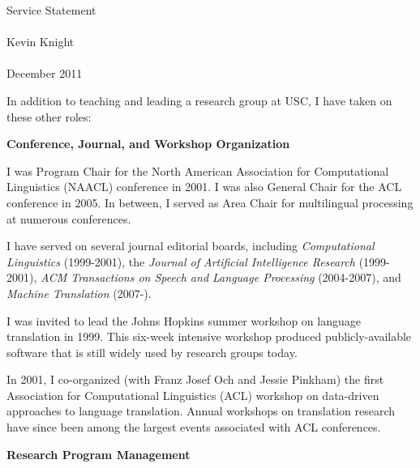 


\newcommand{\hd}[1]{
\vspace*{0.2in} 
\noindent 
{\bf \Large #1}
\hspace{0.1in}
\vspace*{0.2in}}

\vspace{0.5in}


\begin{Large}
\begin{center}
Service Statement \\
\hspace{1mm} \\
Kevin Knight \\
\hspace{1mm} \\
December 2011
\end{center}
\end{Large}

\vspace{0.2in}

\noindent
In addition to teaching and leading a research group at USC, I have 
taken on these other roles:  

\hd{Conference, Journal, and Workshop Organization}

\noindent
I was Program Chair for the North American Association for 
Computational Linguistics (NAACL) conference in 2001.
I was also General Chair for the ACL conference in 2005.  
In between, I served as Area Chair for multilingual processing 
at numerous conferences.

I have served on several journal editorial boards, including {\em 
Computational Linguistics} (1999-2001), the {\em Journal of Artificial 
Intelligence Research} (1999-2001), {\em ACM Transactions on
Speech and Language Processing} (2004-2007), and {\em Machine Translation}
(2007-).

I was invited to lead the Johns Hopkins
summer workshop on language translation in 1999.
This six-week intensive workshop produced publicly-available software
that is still widely used by research groups today. 

In 2001, I co-organized (with Franz Josef Och and Jessie 
Pinkham) the first Association for Computational Linguistics (ACL)
workshop on data-driven approaches to language translation.  Annual
workshops on translation research have since been among the largest 
events associated with ACL conferences.

\hd{Research Program Management}

